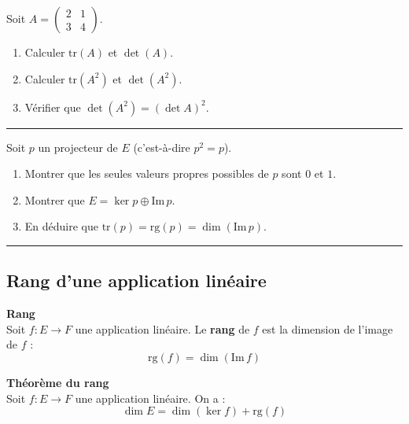 \documentclass[../PolyS4.tex]{subfiles}
\begin{document}

Soit $A = \begin{pmatrix} 2 & 1 \\ 3 & 4 \end{pmatrix}$.
\begin{enumerate}
    \item Calculer $\text{tr}(A)$ et $\det(A)$.
    \item Calculer $\text{tr}(A^2)$ et $\det(A^2)$.
    \item Vérifier que $\det(A^2) = (\det A)^2$.
\end{enumerate}

\vspace{1em}
\hrule
\vspace{1em}


Soit $p$ un projecteur de $E$ (c'est-à-dire $p^2 = p$).
\begin{enumerate}
    \item Montrer que les seules valeurs propres possibles de $p$ sont $0$ et $1$.
    \item Montrer que $E = \ker p \oplus \text{Im}\, p$.
    \item En déduire que $\text{tr}(p) = \text{rg}(p) = \dim(\text{Im}\, p)$.
\end{enumerate}

\vspace{1em}
\hrule
\vspace{1em}

\subsection{Rang d'une application linéaire}

\begin{Def}\textbf{Rang}\\

Soit $f : E \to F$ une application linéaire. Le \textbf{rang} de $f$ est la dimension de l'image de $f$ :
$$\text{rg}(f) = \dim(\text{Im}\, f)$$
\end{Def}

\begin{Thm}\textbf{Théorème du rang}\\

Soit $f : E \to F$ une application linéaire. On a :
$$\dim E = \dim(\ker f) + \text{rg}(f)$$
\end{Thm}
\end{document}
